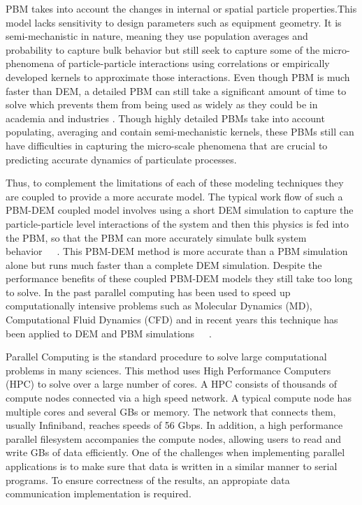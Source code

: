 \documentclass[preprint,11pt,authoryear]{elsarticle}
\begin{document}
PBM takes into account the changes in internal or spatial particle properties.This 
model lacks sensitivity to design parameters such as equipment geometry. It is semi-mechanistic in 
nature, meaning they use population averages and probability to capture bulk behavior but still 
seek to capture some of the micro-phenomena of particle-particle interactions using correlations or 
empirically developed kernels to approximate those interactions. Even though PBM is much faster 
than DEM, a detailed PBM can still take a significant amount of time to solve which prevents them 
from being used as widely as they could be in academia and industries \citep{Barrasso2013}. Though highly 
detailed PBMs take into account populating, averaging and contain semi-mechanistic kernels, these 
PBMs still can have difficulties in capturing the micro-scale phenomena that are crucial to 
predicting accurate dynamics of particulate processes. 

Thus, to complement the limitations of each of these modeling techniques they are coupled to 
provide a more accurate model.  The typical work flow of such a PBM-DEM coupled model involves 
using a short DEM simulation to capture the particle-particle level interactions of the system and 
then this physics is fed into the PBM, so that the PBM can more accurately simulate bulk system 
behavior~\citep{Goldschmidt2003}~\citep{Reinhold2012}~\citep{Barrasso2013}. This PBM-DEM 
method is more accurate than a PBM simulation alone but runs much faster than a complete DEM 
simulation. Despite the performance benefits of these coupled PBM-DEM models they still take too 
long to solve. In the past parallel computing has been used to speed up computationally intensive 
problems such as Molecular Dynamics (MD), Computational Fluid Dynamics (CFD) and in recent 
years  this technique has been applied to DEM and PBM simulations~\citep{Bettencourt2017}~\citep{Prakash2013a}~\citep{Gunawan2008}.


Parallel Computing is the standard procedure to solve large computational problems in many sciences. 
This method uses High Performance Computers (HPC) to solve over a large number of cores. 
A HPC consists of thousands of compute nodes connected via a high speed network. A typical compute 
node has multiple cores and several GBs or memory. The network that connects them, usually Infiniband, 
reaches speeds of 56 Gbps. In addition, a high performance parallel filesystem accompanies the compute 
nodes, allowing users to read and write GBs of data efficiently. One of the challenges when implementing 
parallel applications is to make sure that data is written in a similar manner to serial programs. To 
ensure correctness of the results, an appropiate data communication implementation is required.
\end{document}
